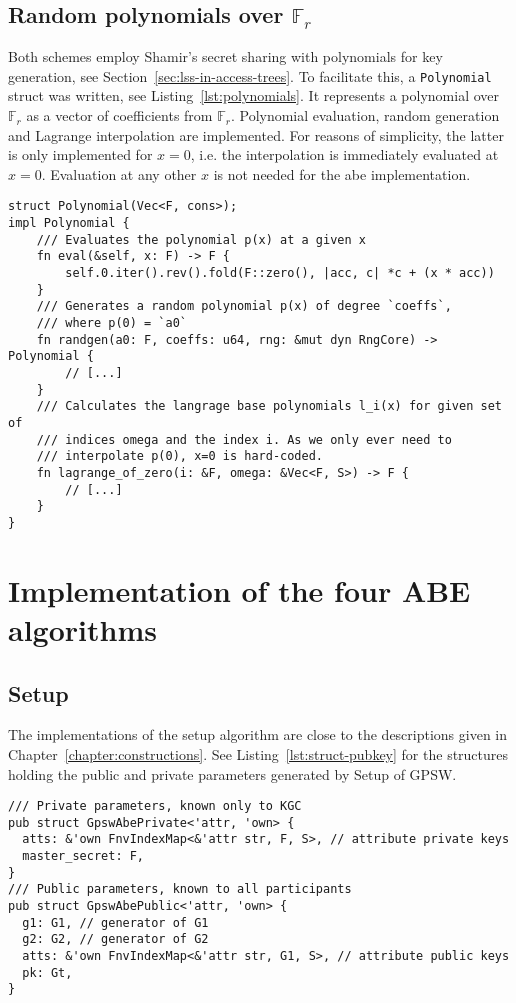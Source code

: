 \subsection{Random polynomials over $\mathbb{F}_r$}

Both schemes employ Shamir's secret sharing with polynomials for key generation, see Section~\ref{sec:lss-in-access-trees}.
To facilitate this, a \texttt{Polynomial} struct was written, see Listing~\ref{lst:polynomials}.
It represents a polynomial over $\mathbb{F}_r$ as a vector of coefficients from $\mathbb{F}_r$.
Polynomial evaluation, random generation and Lagrange interpolation are implemented.
For reasons of simplicity, the latter is only implemented for $x=0$, i.e. the interpolation is immediately evaluated at $x=0$.
Evaluation at any other $x$ is not needed for the \acrshort{abe} implementation.

\begin{lstlisting}[caption={Implementation of polynomials over $\mathbb{F}_r$},label={lst:polynomials}]
struct Polynomial(Vec<F, cons>);
impl Polynomial {
    /// Evaluates the polynomial p(x) at a given x
    fn eval(&self, x: F) -> F {
        self.0.iter().rev().fold(F::zero(), |acc, c| *c + (x * acc))
    }
    /// Generates a random polynomial p(x) of degree `coeffs`,
    /// where p(0) = `a0`
    fn randgen(a0: F, coeffs: u64, rng: &mut dyn RngCore) -> Polynomial {
        // [...]
    }
    /// Calculates the langrage base polynomials l_i(x) for given set of
    /// indices omega and the index i. As we only ever need to
    /// interpolate p(0), x=0 is hard-coded.
    fn lagrange_of_zero(i: &F, omega: &Vec<F, S>) -> F {
        // [...]
    }
}
\end{lstlisting}

\section{Implementation of the four ABE algorithms}
\subsection{Setup}
The implementations of the setup algorithm are close to the descriptions given in Chapter~\ref{chapter:constructions}.
See Listing~\ref{lst:struct-pubkey} for the structures holding the public and private parameters generated by Setup of GPSW.

\begin{lstlisting}[caption={Private and public system parameters structs for GPSW},label={lst:struct-pubkey}]
/// Private parameters, known only to KGC
pub struct GpswAbePrivate<'attr, 'own> {
  atts: &'own FnvIndexMap<&'attr str, F, S>, // attribute private keys
  master_secret: F,
}
/// Public parameters, known to all participants
pub struct GpswAbePublic<'attr, 'own> {
  g1: G1, // generator of G1
  g2: G2, // generator of G2
  atts: &'own FnvIndexMap<&'attr str, G1, S>, // attribute public keys
  pk: Gt,
}
\end{lstlisting}

